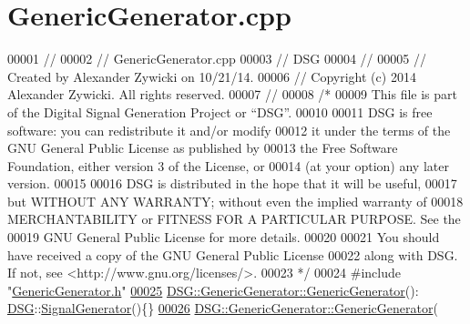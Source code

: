 \hypertarget{_generic_generator_8cpp_source}{\section{Generic\+Generator.\+cpp}
\label{_generic_generator_8cpp_source}
}

\begin{DoxyCode}
00001 \textcolor{comment}{//}
00002 \textcolor{comment}{//  GenericGenerator.cpp}
00003 \textcolor{comment}{//  DSG}
00004 \textcolor{comment}{//}
00005 \textcolor{comment}{//  Created by Alexander Zywicki on 10/21/14.}
00006 \textcolor{comment}{//  Copyright (c) 2014 Alexander Zywicki. All rights reserved.}
00007 \textcolor{comment}{//}
00008 \textcolor{comment}{/*}
00009 \textcolor{comment}{ This file is part of the Digital Signal Generation Project or “DSG”.}
00010 \textcolor{comment}{}
00011 \textcolor{comment}{ DSG is free software: you can redistribute it and/or modify}
00012 \textcolor{comment}{ it under the terms of the GNU General Public License as published by}
00013 \textcolor{comment}{ the Free Software Foundation, either version 3 of the License, or}
00014 \textcolor{comment}{ (at your option) any later version.}
00015 \textcolor{comment}{}
00016 \textcolor{comment}{ DSG is distributed in the hope that it will be useful,}
00017 \textcolor{comment}{ but WITHOUT ANY WARRANTY; without even the implied warranty of}
00018 \textcolor{comment}{ MERCHANTABILITY or FITNESS FOR A PARTICULAR PURPOSE.  See the}
00019 \textcolor{comment}{ GNU General Public License for more details.}
00020 \textcolor{comment}{}
00021 \textcolor{comment}{ You should have received a copy of the GNU General Public License}
00022 \textcolor{comment}{ along with DSG.  If not, see <http://www.gnu.org/licenses/>.}
00023 \textcolor{comment}{ */}
00024 \textcolor{preprocessor}{#include "\hyperlink{_generic_generator_8h}{GenericGenerator.h}"}
\hypertarget{_generic_generator_8cpp_source_l00025}{}\hyperlink{class_d_s_g_1_1_generic_generator_a560df325ce43fa9a1baf4463ccaed2d3}{00025} \hyperlink{class_d_s_g_1_1_generic_generator_a560df325ce43fa9a1baf4463ccaed2d3}{DSG::GenericGenerator::GenericGenerator}():
      \hyperlink{namespace_d_s_g}{DSG}::\hyperlink{class_d_s_g_1_1_signal_generator}{SignalGenerator}()\{\}
\hypertarget{_generic_generator_8cpp_source_l00026}{}\hyperlink{class_d_s_g_1_1_generic_generator_a1dbab25aa71cb7bce7e4b02be5122244}{00026} \hyperlink{class_d_s_g_1_1_generic_generator_a560df325ce43fa9a1baf4463ccaed2d3}{DSG::GenericGenerator::GenericGenerator}(

\end{DoxyCode}
